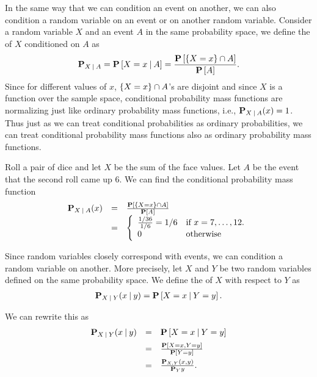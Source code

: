 \begin{flex}
\begin{gram}
In the same way that we can condition an event on another, we can also
condition a random variable on an event or on another random variable.
%
Consider a random variable $X$ and an event $A$ in the same probability
space, we define the  of
$X$ conditioned on  $A$ as 
\[
\mathbf{P}_{X {\:\mid\:} A} = \mathbf{P}\left[{X = x {\:\mid\:} A}\right] = \frac{\mathbf{P}\left[{\{X =x\} \cap A}\right]}{\mathbf{P}\left[{A}\right]}.
\]
%
Since for different values of $x$, $\{X =x\} \cap A$'s are
disjoint and since $X$ is a function over the sample space,
conditional probability mass functions are normalizing just like
ordinary probability mass functions, i.e., $\mathbf{P}_{X {\:\mid\:} A}(x) = 1$.
%
Thus just as we can treat conditional probabilities as ordinary
probabilities, we can treat conditional probability  mass functions
also as ordinary probability mass functions.
\end{gram}


\begin{example}
Roll a pair of dice and let $X$ be the sum of the face values.  Let
$A$ be the event that the second roll came up $6$.
%
We can find the conditional probability mass function 
\[
\begin{array}{lll}
\mathbf{P}_{X {\:\mid\:} A}(x) & = & \frac{\mathbf{P}\left[{\{X =x\} \cap A}\right]}{\mathbf{P}\left[{A}\right]}
\\
& = & 
\left\{
\begin{array}{ll}
\frac{1/36}{1/6} = 1/6 & \mbox{if}~x = 7,  \ldots, 12.
\\
0 & \mbox{otherwise}
\end{array}
\right.
\end{array}
\]
 
\end{example}
\end{flex}

\begin{gram}
Since random variables closely correspond with events, we can
condition a random variable on another.
%
More precisely, let $X$ and $Y$ be two random variables defined on the
same probability space.
%
We define the  of $X$ with
respect to $Y$ as 
\[
\begin{array}{l}
\mathbf{P}_{X {\:\mid\:} Y}(x {\:\mid\:} y) = \mathbf{P}\left[{X = x {\:\mid\:} Y = y}\right].
\end{array}
\] 

We can rewrite this as 
\[
\begin{array}{lll}
\mathbf{P}_{X {\:\mid\:}{} Y}(x {\:\mid\:}{} y) 
& = & \mathbf{P}\left[{X = x {\:\mid\:}{} Y = y}\right]
\\[2mm]
& = & \frac{\mathbf{P}\left[{X = x, Y = y}\right]}{\mathbf{P}\left[{Y = y}\right]}
\\[2mm]
& = & \frac{\mathbf{P}_{X,Y}(x,y)}{\mathbf{P}_{Y}{y}}.
\end{array}
\] 
\end{gram}

